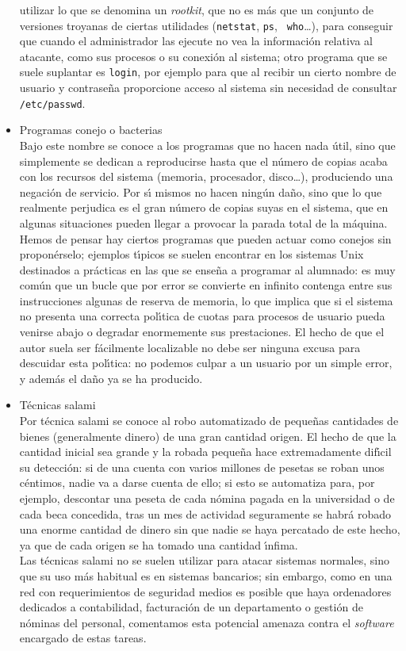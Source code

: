 \begin{itemize}
utilizar lo que se denomina un {\it rootkit}, que no es m\'as que un conjunto
de versiones troyanas de ciertas utilidades ({\tt netstat}, {\tt ps}, {\tt 
who}\ldots), para conseguir que cuando el administrador las ejecute no vea la 
informaci\'on relativa al atacante, como sus procesos o su conexi\'on al 
sistema; otro programa que se suele suplantar es {\tt login}, por ejemplo
para que al recibir un cierto nombre de usuario y contrase\~na proporcione 
acceso al sistema sin necesidad de consultar {\tt /etc/passwd}.
\item Programas conejo o bacterias\\
Bajo este nombre se conoce a los programas que no hacen nada \'util, sino que
simplemente se dedican a reproducirse hasta que el n\'umero de copias acaba con
los recursos del sistema (memoria, procesador, disco\ldots), produciendo una
negaci\'on de servicio. Por s\'{\i} mismos no hacen ning\'un da\~no, sino que 
lo que realmente perjudica es el gran n\'umero de copias suyas en el sistema,
que en algunas situaciones pueden llegar a provocar la parada total de la 
m\'aquina.\\
Hemos de pensar hay ciertos programas que pueden actuar como conejos sin 
propon\'erselo; ejemplos t\'{\i}picos se suelen encontrar en los sistemas Unix
destinados a pr\'acticas en las que se ense\~na a programar al alumnado: es
muy com\'un que un bucle que por error se convierte en infinito contenga entre
sus instrucciones algunas de reserva de memoria, lo que implica que si el 
sistema no presenta una correcta pol\'{\i}tica de cuotas para procesos de 
usuario pueda venirse abajo o degradar enormemente sus prestaciones. El hecho
de que el autor suela ser f\'acilmente localizable no debe ser ninguna excusa
para descuidar esta pol\'{\i}tica: no podemos culpar a un usuario por un simple
error, y adem\'as el da\~no ya se ha producido.
\item T\'ecnicas salami\\
Por t\'ecnica salami se conoce al robo automatizado de peque\~nas cantidades 
de bienes (ge\-ne\-ral\-men\-te dinero) de una gran cantidad origen. El hecho 
de que la cantidad inicial sea grande y la robada peque\~na hace extremadamente 
dif\'{\i}cil su detecci\'on: si de una cuenta con varios millones de pesetas
se roban unos c\'entimos, nadie va a darse cuenta de ello; si esto se automatiza
para, por ejemplo, descontar una peseta de cada n\'omina pagada en la 
universidad o de cada beca concedida, tras un mes de actividad seguramente se
habr\'a robado una enorme cantidad de dinero sin que nadie se haya percatado de
este hecho, ya que de cada origen se ha tomado una cantidad \'{\i}nfima.\\
Las t\'ecnicas salami no se suelen utilizar para atacar sistemas normales, sino 
que su uso m\'as habitual es en sistemas bancarios; sin embargo, como en una red
con requerimientos de seguridad medios es posible que haya ordenadores dedicados
a contabilidad, facturaci\'on
de un departamento o gesti\'on de n\'ominas del personal, comentamos esta 
potencial amenaza contra el {\it software} encargado de estas tareas. 
\end{itemize}
